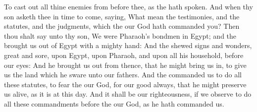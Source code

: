 \begin{biblechapter}
\verse To cast out all thine enemies from before thee, as the \LORD hath spoken.
\verse And when thy son asketh thee in time to come, saying, What mean the testimonies, and the statutes, and the judgments, which the \LORD our God hath commanded you?
\verse Then thou shalt say unto thy son, We were Pharaoh's bondmen in Egypt; and the \LORD brought us out of Egypt with a mighty hand:
\verse And the \LORD shewed signs and wonders, great and sore, upon Egypt, upon Pharaoh, and upon all his household, before our eyes:
\verse And he brought us out from thence, that he might bring us in, to give us the land which he sware unto our fathers.
\verse And the \LORD commanded us to do all these statutes, to fear the \LORD our God, for our good always, that he might preserve us alive, as it is at this day.
\verse And it shall be our righteousness, if we observe to do all these commandments before the \LORD our God, as he hath commanded us.
\end{biblechapter}

